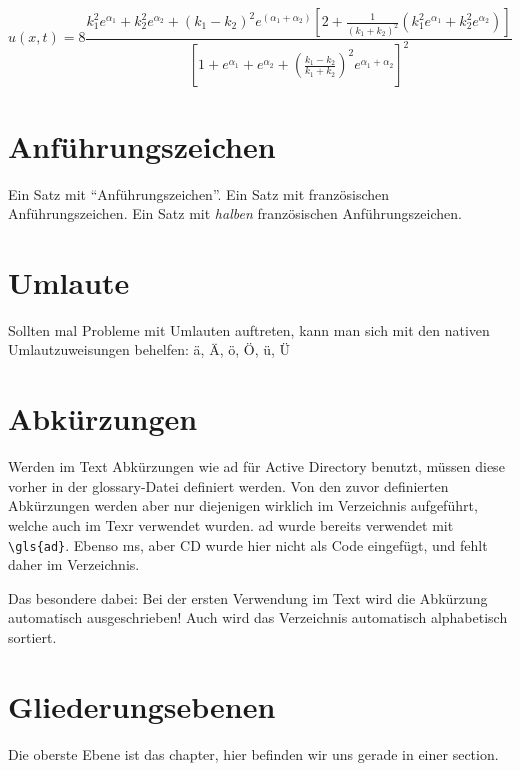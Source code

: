 \begin{equation}%
u(x,t)= 8 \frac{k_{1}^{2}e^{\alpha_{1}} + k_{2}^{2}e^{\alpha_{2}} + (k_{1}-k_{2})^{2}e^{(\alpha_{1}+ \alpha_{2})} \left[2 + \frac{1}{(k_{1} + k_{2})^{2}} ( k_{1}^{2}e^{\alpha_{1}} + k_{2}^{2}e^{\alpha_{2}}) \right]}{\left[1+e^{\alpha_{1}} + e^{\alpha_{2}} + \left(\frac{k_{1} - k_{2}}{k_{1}+k_{2}} \right)^{2} e^{\alpha_{1}+ \alpha_{2}} \right]^{2}}
\end{equation}%






\section{Anführungszeichen}
Ein Satz mit "`Anführungszeichen"'.
Ein Satz mit französischen \frqq Anführungszeichen\flqq.
Ein Satz mit \textit{halben} französischen \frq Anführungszeichen\flq.



\section{Umlaute}
Sollten mal Probleme mit Umlauten auftreten, kann man sich mit den nativen Umlautzuweisungen behelfen:
\"a, \"A, \"o, \"O, \"u, \"U



\section{Abkürzungen}
Werden im Text Abkürzungen wie \gls{ad} für Active Directory benutzt, müssen diese vorher in der glossary-Datei definiert werden.
Von den zuvor definierten Abkürzungen werden aber nur diejenigen wirklich im Verzeichnis aufgeführt, welche auch im Texr verwendet wurden.
\gls{ad} wurde bereits verwendet mit \verb+\gls{ad}+. Ebenso \gls{ms}, aber CD wurde hier nicht als Code eingefügt, und fehlt daher im Verzeichnis.

Das besondere dabei: Bei der ersten Verwendung im Text wird die Abkürzung automatisch ausgeschrieben! Auch wird das Verzeichnis automatisch alphabetisch sortiert.




\section{Gliederungsebenen}
Die oberste Ebene ist das chapter, hier befinden wir uns gerade in einer section.
